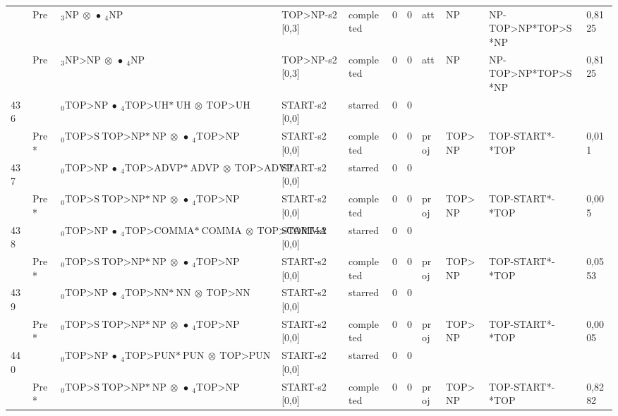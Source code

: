 \documentclass[10pt]{article}
\begin{document}
\begin{longtable}[htbp]{lllllllllll}
 & Pre & $ {}_3 \textrm{NP} \  \otimes \  \bullet \ {}_{4} \textrm{NP} $ & TOP>NP-s2 [0,3] & completed & 0 & 0 & att & NP & NP-TOP>NP*TOP>S*NP & 0,8125 \\ 
 & Pre & $ {}_3 \textrm{NP>NP} \  \otimes \  \bullet \ {}_{4} \textrm{NP} $ & TOP>NP-s2 [0,3] & completed & 0 & 0 & att & NP & NP-TOP>NP*TOP>S*NP & 0,8125 \\ 
436 & & $ {}_0 \textrm{TOP>NP} \  \bullet \ {}_{4} \textrm{TOP>UH*} \ \textrm{UH} \  \otimes \ \textrm{TOP>UH} $ & START-s2 [0,0] & starred & 0 & 0 & & & & \\ 
 & Pre *& $ {}_0 \textrm{TOP>S} \ \textrm{TOP>NP*} \ \textrm{NP} \  \otimes \  \bullet \ {}_{4} \textrm{TOP>NP} $ & START-s2 [0,0] & completed & 0 & 0 & proj & TOP>NP & TOP-START*-*TOP & 0,011 \\ 
437 & & $ {}_0 \textrm{TOP>NP} \  \bullet \ {}_{4} \textrm{TOP>ADVP*} \ \textrm{ADVP} \  \otimes \ \textrm{TOP>ADVP} $ & START-s2 [0,0] & starred & 0 & 0 & & & & \\ 
 & Pre *& $ {}_0 \textrm{TOP>S} \ \textrm{TOP>NP*} \ \textrm{NP} \  \otimes \  \bullet \ {}_{4} \textrm{TOP>NP} $ & START-s2 [0,0] & completed & 0 & 0 & proj & TOP>NP & TOP-START*-*TOP & 0,005 \\ 
438 & & $ {}_0 \textrm{TOP>NP} \  \bullet \ {}_{4} \textrm{TOP>COMMA*} \ \textrm{COMMA} \  \otimes \ \textrm{TOP>COMMA} $ & START-s2 [0,0] & starred & 0 & 0 & & & & \\ 
 & Pre *& $ {}_0 \textrm{TOP>S} \ \textrm{TOP>NP*} \ \textrm{NP} \  \otimes \  \bullet \ {}_{4} \textrm{TOP>NP} $ & START-s2 [0,0] & completed & 0 & 0 & proj & TOP>NP & TOP-START*-*TOP & 0,0553 \\ 
439 & & $ {}_0 \textrm{TOP>NP} \  \bullet \ {}_{4} \textrm{TOP>NN*} \ \textrm{NN} \  \otimes \ \textrm{TOP>NN} $ & START-s2 [0,0] & starred & 0 & 0 & & & & \\ 
 & Pre *& $ {}_0 \textrm{TOP>S} \ \textrm{TOP>NP*} \ \textrm{NP} \  \otimes \  \bullet \ {}_{4} \textrm{TOP>NP} $ & START-s2 [0,0] & completed & 0 & 0 & proj & TOP>NP & TOP-START*-*TOP & 0,0005 \\ 
440 & & $ {}_0 \textrm{TOP>NP} \  \bullet \ {}_{4} \textrm{TOP>PUN*} \ \textrm{PUN} \  \otimes \ \textrm{TOP>PUN} $ & START-s2 [0,0] & starred & 0 & 0 & & & & \\ 
 & Pre *& $ {}_0 \textrm{TOP>S} \ \textrm{TOP>NP*} \ \textrm{NP} \  \otimes \  \bullet \ {}_{4} \textrm{TOP>NP} $ & START-s2 [0,0] & completed & 0 & 0 & proj & TOP>NP & TOP-START*-*TOP & 0,8282 \\ 

\end{longtable}
\end{document}
